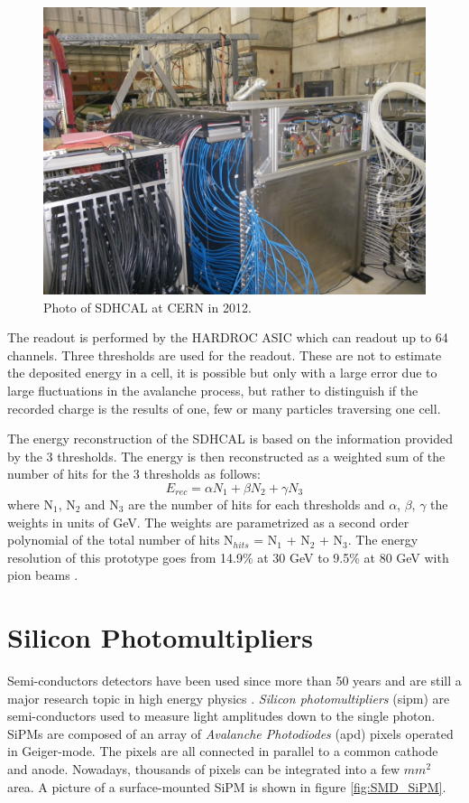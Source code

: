 \begin{figure}[htbp!]
  \centering
  \includegraphics[width=0.7\linewidth]{chap3/fig/SDHCAL.jpg}
  \caption{Photo of SDHCAL at CERN in 2012.} \label{fig:SDHCAL}
\end{figure}

The readout is performed by the HARDROC ASIC \cite{HARDROC:IEEE} which can readout up to 64 channels. Three thresholds are used for the readout. These are not to estimate the deposited energy in a cell, it is possible but only with a large error due to large fluctuations in the avalanche process, but rather to distinguish if the recorded charge is the results of one, few or many particles traversing one cell.

The energy reconstruction of the SDHCAL is based on the information provided by the 3 thresholds. The energy is then reconstructed as a weighted sum of the number of hits for the 3 thresholds as follows:
\begin{equation}
  E_{rec} = \alpha N_1 + \beta N_2 + \gamma N_3
\end{equation}
where N$_1$, N$_2$ and N$_3$ are the number of hits for each thresholds and $\alpha$, $\beta$, $\gamma$ the weights in units of GeV. The weights are parametrized as a second order polynomial of the total number of hits N$_{hits}$ =  N$_1$ + N$_2$ + N$_3$. The energy resolution of this prototype goes from 14.9\% at 30 GeV to 9.5\% at 80 GeV with pion beams \cite{Buridon:2016ill}.

\section{Silicon Photomultipliers}
\label{sec:SiPM}

Semi-conductors detectors have been used since more than 50 years and are still a major research topic in high energy physics \cite{1748-0221-4-04-P04004, Garutti:2011qv, Garutti:2017ipx}. \textit{Silicon photomultipliers} (\acrshort{sipm}) are semi-conductors used to measure light amplitudes down to the single photon. SiPMs are composed of an array of \textit{Avalanche Photodiodes} (\acrshort{apd}) pixels operated in Geiger-mode. The pixels are all connected in parallel to a common cathode and anode. Nowadays, thousands of pixels can be integrated into a few $mm^2$ area. A picture of a surface-mounted SiPM is shown in figure \ref{fig:SMD_SiPM}.

